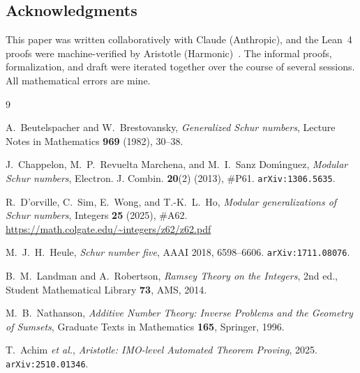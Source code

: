 \documentclass[11pt]{amsart}
\theoremstyle{plain}
\theoremstyle{definition}
\begin{document}
\subsection*{Acknowledgments}

This paper was written collaboratively with Claude (Anthropic), and the Lean~4 proofs were machine-verified by Aristotle (Harmonic)~\cite{aristotle}. The informal proofs, formalization, and draft were iterated together over the course of several sessions. All mathematical errors are mine.

\begin{thebibliography}{9}

A.~Beutelspacher and W.~Brestovansky,
\emph{Generalized Schur numbers},
Lecture Notes in Mathematics \textbf{969} (1982), 30--38.

J.~Chappelon, M.~P.~Revuelta Marchena, and M.~I.~Sanz Dom\'\i nguez,
\emph{Modular Schur numbers},
Electron. J. Combin. \textbf{20}(2) (2013), \#P61. \texttt{arXiv:1306.5635}.

R.~D'orville, C.~Sim, E.~Wong, and T.-K.~L.~Ho,
\emph{Modular generalizations of Schur numbers},
Integers \textbf{25} (2025), \#A62.
\url{https://math.colgate.edu/~integers/z62/z62.pdf}

M.~J.~H.~Heule,
\emph{Schur number five},
AAAI 2018, 6598--6606. \texttt{arXiv:1711.08076}.

B.~M.~Landman and A.~Robertson,
\emph{Ramsey Theory on the Integers}, 2nd ed.,
Student Mathematical Library \textbf{73}, AMS, 2014.

M.~B.~Nathanson,
\emph{Additive Number Theory: Inverse Problems and the Geometry of Sumsets},
Graduate Texts in Mathematics \textbf{165}, Springer, 1996.

T.~Achim \emph{et al.},
\emph{Aristotle: IMO-level Automated Theorem Proving},
2025. \texttt{arXiv:2510.01346}.

\end{thebibliography}
\end{document}
